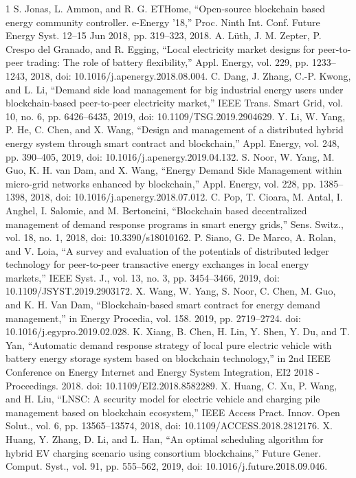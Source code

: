 \documentclass[lettersize,journal]{IEEEtran}
\begin{document}
\begin{thebibliography}{1}
\bibitem{}S. Jonas, L. Ammon, and R. G. ETHome, “Open-source blockchain based energy community controller. e-Energy ’18,” Proc. Ninth Int. Conf. Future Energy Syst. 12–15 Jun 2018, pp. 319–323, 2018.
\bibitem{}A. Lüth, J. M. Zepter, P. Crespo del Granado, and R. Egging, “Local electricity market designs for peer-to-peer trading: The role of battery flexibility,” Appl. Energy, vol. 229, pp. 1233–1243, 2018, doi: 10.1016/j.apenergy.2018.08.004.
\bibitem{}C. Dang, J. Zhang, C.-P. Kwong, and L. Li, “Demand side load management for big industrial energy users under blockchain-based peer-to-peer electricity market,” IEEE Trans. Smart Grid, vol. 10, no. 6, pp. 6426–6435, 2019, doi: 10.1109/TSG.2019.2904629.
\bibitem{}Y. Li, W. Yang, P. He, C. Chen, and X. Wang, “Design and management of a distributed hybrid energy system through smart contract and blockchain,” Appl. Energy, vol. 248, pp. 390–405, 2019, doi: 10.1016/j.apenergy.2019.04.132.
\bibitem{}S. Noor, W. Yang, M. Guo, K. H. van Dam, and X. Wang, “Energy Demand Side Management within micro-grid networks enhanced by blockchain,” Appl. Energy, vol. 228, pp. 1385–1398, 2018, doi: 10.1016/j.apenergy.2018.07.012.
\bibitem{}C. Pop, T. Cioara, M. Antal, I. Anghel, I. Salomie, and M. Bertoncini, “Blockchain based decentralized management of demand response programs in smart energy grids,” Sens. Switz., vol. 18, no. 1, 2018, doi: 10.3390/s18010162.
\bibitem{}P. Siano, G. De Marco, A. Rolan, and V. Loia, “A survey and evaluation of the potentials of distributed ledger technology for peer-to-peer transactive energy exchanges in local energy markets,” IEEE Syst. J., vol. 13, no. 3, pp. 3454–3466, 2019, doi: 10.1109/JSYST.2019.2903172.
\bibitem{}X. Wang, W. Yang, S. Noor, C. Chen, M. Guo, and K. H. Van Dam, “Blockchain-based smart contract for energy demand management,” in Energy Procedia, vol. 158. 2019, pp. 2719–2724. doi: 10.1016/j.egypro.2019.02.028.
\bibitem{}K. Xiang, B. Chen, H. Lin, Y. Shen, Y. Du, and T. Yan, “Automatic demand response strategy of local pure electric vehicle with battery energy storage system based on blockchain technology,” in 2nd IEEE Conference on Energy Internet and Energy System Integration, EI2 2018 - Proceedings. 2018. doi: 10.1109/EI2.2018.8582289.
\bibitem{}X. Huang, C. Xu, P. Wang, and H. Liu, “LNSC: A security model for electric vehicle and charging pile management based on blockchain ecosystem,” IEEE Access Pract. Innov. Open Solut., vol. 6, pp. 13565–13574, 2018, doi: 10.1109/ACCESS.2018.2812176.
\bibitem{}X. Huang, Y. Zhang, D. Li, and L. Han, “An optimal scheduling algorithm for hybrid EV charging scenario using consortium blockchains,” Future Gener. Comput. Syst., vol. 91, pp. 555–562, 2019, doi: 10.1016/j.future.2018.09.046.

\end{thebibliography}
\end{document}
